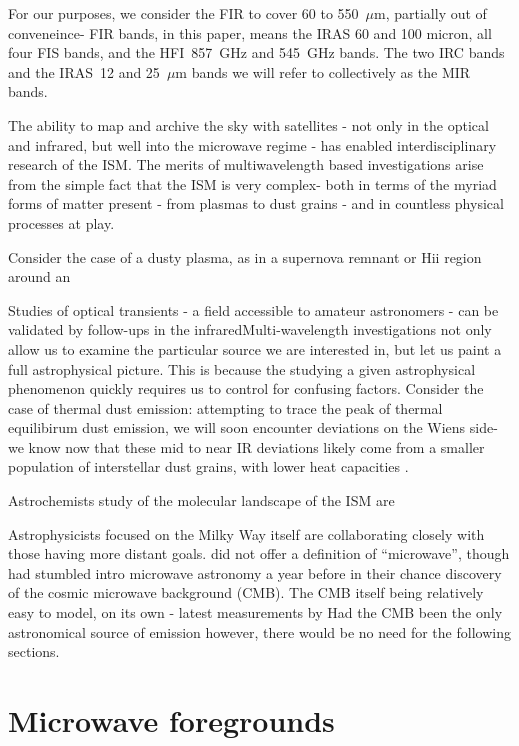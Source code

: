    For our purposes, we consider the FIR to cover 60 to 550~$\mu$m, partially out of conveneince- FIR bands, in this paper, means the IRAS 60 and 100 micron, all four FIS bands, and the HFI~857~GHz and 545~GHz bands. The two IRC bands and the IRAS~12 and 25~$\mu$m bands we will refer to collectively as the MIR bands.

  The ability to map and archive the sky with satellites - not only in the optical and infrared, but well into the microwave regime - has enabled interdisciplinary research of the ISM. The merits of multiwavelength based investigations arise from the simple fact that the ISM is very complex- both in terms of the myriad forms of matter present - from plasmas to dust grains - and in countless physical processes at play.

   Consider the case of a dusty plasma, as in a supernova remnant or Hii region around an

   Studies of optical transients - a field accessible to amateur astronomers - can be validated by follow-ups in the infraredMulti-wavelength investigations not only allow us to examine the particular source we are interested in, but let us paint a full astrophysical picture. This is because the studying a given astrophysical phenomenon quickly requires us to control for confusing factors. Consider the case of thermal dust emission: attempting to trace the peak of thermal equilibirum dust emission, we will soon encounter deviations on the Wiens side- we know now that these mid to near IR deviations likely come from a smaller population of interstellar dust grains, with lower heat capacities \citep{purcell76, sellgren84,dwek86,draine01}.

  Astrochemists study of the molecular landscape of the ISM are

  Astrophysicists focused on the Milky Way itself are collaborating closely with those having more distant goals. \cite{johnson66} did not offer a definition of ``microwave'', though \cite{penzias65} had stumbled intro microwave astronomy a year before in their chance discovery of the cosmic microwave background (CMB). The CMB itself being relatively easy to model, on its own - latest measurements by Had the CMB been the only astronomical source of emission however, there would be no need for the following sections.

\section{Microwave foregrounds}


